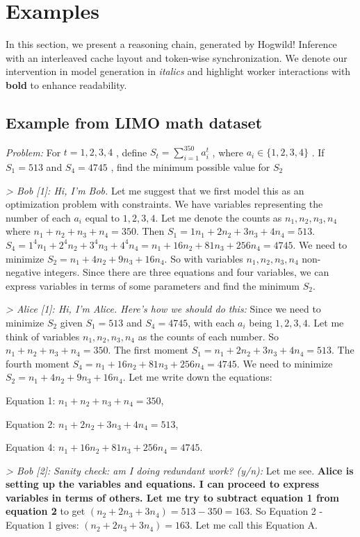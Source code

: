 
\section{Examples}\label{sect:appendix_examples}

In this section, we present a reasoning chain, generated by Hogwild!\! Inference with an interleaved cache layout and token-wise synchronization.
We denote our intervention in model generation in \textit{italics} and highlight worker interactions with \textbf{bold} to enhance readability.
\subsection{Example from LIMO math dataset}\label{sect:appendix_example_1}
\textit{Problem:} For $t = 1, 2, 3, 4$ , define $S_t = \sum_{i = 1}^{350}a_i^t$ , where $a_i \in \{1,2,3,4\}$ . If $S_1 = 513$ and $S_4 = 4745$ , find the minimum possible value for $S_2$

\textit{> Bob [1]: Hi, I'm Bob.} Let me suggest that we first model this as an optimization problem with constraints. We have variables representing the number of each $a_i$ equal to $1,2,3,4$. Let me denote the counts as $n_1,n_2,n_3,n_4$ where $n_1 + n_2 +n_3 +n_4 =350$. Then $S_1=1 n_1 +2n_2 +3n_3 +4n_4 =513$. $S_4=1^4n_1 +2^4n_2 +3^4n_3 +4^4n_4 = n_1 +16n_2 +81n_3 +256n_4=4745$. We need to minimize $S_2= n_1 +4n_2 +9n_3 +16n_4$. So with variables $n_1,n_2,n_3,n_4$ non-negative integers. Since there are three equations and four variables, we can express variables in terms of some parameters and find the minimum $S_2$.

\textit{> Alice [1]: Hi, I'm Alice. Here's how we should do this:} Since we need to minimize $S_2$ given $S_1=513$ and $S_4=4745$, with each $a_i$ being $1,2,3,4$. Let me think of variables $n_1,n_2,n_3,n_4$ as the counts of each number. So $n_1 +n_2 +n_3 +n_4=350$. The first moment $S_1 =n_1 +2n_2 +3n_3 +4n_4=513$. The fourth moment $S_4 =n_1 +16n_2 +81n_3 +256n_4=4745$. We need to minimize $S_2 =n_1 +4n_2 +9n_3 +16n_4$. Let me write down the equations:

Equation 1: $n_1 +n_2 +n_3 +n_4=350$,

Equation 2: $n_1 +2n_2 +3n_3 +4n_4=513$,

Equation 4: $n_1 +16n_2 +81n_3 +256n_4=4745$.


\textit{> Bob [2]:} \textit{Sanity check: am I doing redundant work? (y/n):} Let me see. \textbf{Alice is setting up the variables and equations. I can proceed to express variables in terms of others. Let me try to subtract equation 1 from equation 2} to get $(n_2 +2n_3 +3n_4)=513-350=163$. So Equation 2 - Equation 1 gives: $(n_2 +2n_3 +3n_4)=163$. Let me call this Equation A.

